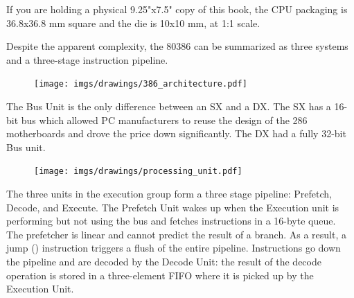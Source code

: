 \documentclass[book.tex]{subfiles}
\begin{document}
 \pagebreak
 


\par {}
If you are holding a physical 9.25"x7.5" copy of this book, the CPU packaging is 36.8x36.8 mm square and the die is 10x10 mm, at 1:1 scale.\\
\par Despite the apparent complexity, the 80386 can be summarized as three systems and a three-stage instruction pipeline.


\begin{figure}[H]
\centering
\texttt{[image: imgs/drawings/386\_architecture.pdf]}
\end{figure}
\par
The Bus Unit is the only difference between an SX and a DX. The SX has a 16-bit bus which allowed PC manufacturers to reuse the design of the 286 motherboards and drove the price down significantly. The DX had a fully 32-bit Bus unit.
\par
\begin{figure}[H]
\centering
\texttt{[image: imgs/drawings/processing\_unit.pdf]}
\end{figure}
\par
The three units in the execution group form a three stage pipeline: Prefetch, Decode, and Execute. The Prefetch Unit wakes up when the Execution unit is performing but not using the bus and fetches instructions in a 16-byte queue. The prefetcher is linear and cannot predict the result of a branch. As a result, a jump () instruction triggers a flush of the entire pipeline. Instructions go down the pipeline and are decoded by the Decode Unit: the result of the decode operation is stored in a three-element FIFO where it is picked up by the Execution Unit.\\
\par
\end{document}
